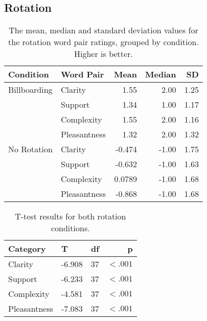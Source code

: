 \subsection{Rotation}
\begin{table}[H]
    \centering
    \caption{The mean, median and standard deviation values for the rotation word pair ratings, grouped by condition. Higher is better.}
    \begin{tabular}{llrrr}
    \toprule
    \textbf{Condition} & \textbf{Word Pair} & \textbf{Mean} & \textbf{Median} & \textbf{SD} \\
    \midrule
    Billboarding       & Clarity            & 1.55          & 2.00            & 1.25 \\
                       & Support            & 1.34          & 1.00            & 1.17 \\
                       & Complexity         & 1.55          & 2.00            & 1.16 \\
                       & Pleasantness       & 1.32          & 2.00            & 1.32 \\
    \midrule      
    No Rotation        & Clarity            & -0.474        & -1.00           & 1.75 \\
                       & Support            & -0.632        & -1.00           & 1.63 \\
                       & Complexity         & 0.0789        & -1.00           & 1.68 \\
                       & Pleasantness       & -0.868        & -1.00           & 1.68 \\
    \bottomrule
    \end{tabular}
\end{table}

\begin{table}[H]
    \centering
    \caption{T-test results for both rotation conditions.}
    \label{tab:ttestRotation}
    \begin{tabular}{llrr}
    \toprule
    \textbf{Category} & \textbf{T} & \textbf{df} & \textbf{p}       \\
    \midrule
    Clarity           & -6.908     & 37          & \textbf{$<.001$} \\
    Support           & -6.233     & 37          & \textbf{$<.001$} \\
    Complexity        & -4.581     & 37          & \textbf{$<.001$} \\
    Pleasantness      & -7.083     & 37          & \textbf{$<.001$} \\
    \bottomrule     
    \end{tabular}
\end{table}



